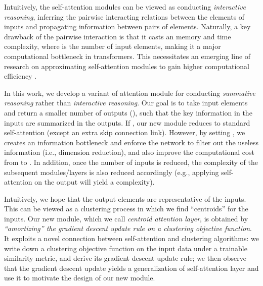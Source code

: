 \documentclass[english]{article}
\begin{document}
Intuitively, 
the self-attention modules 
can be viewed as conducting \emph{interactive reasoning}, 
inferring the pairwise interacting relations between the elements of inputs and 
propagating information between pairs of elements. 
Naturally, a key drawback of the pairwise interaction  is that it casts an  memory and time complexity, where  is the number of input elements, making it a major computational bottleneck in transformers. 
This necessitates an emerging line of research on approximating self-attention modules to gain higher computational efficiency 
\citep{kitaev2019reformer, katharopoulos2020transformers, wang2020linformer}. 





In this work, we develop a variant of attention module  for conducting \emph{summative reasoning} rather than \emph{interactive reasoning}. 
Our goal is to take  input elements and return a smaller number  of outputs (), such that the key information in the  inputs are summarized in the  outputs. 
If , our new module  reduces to standard self-attention  (except an extra skip connection link). 
However, by setting , 
we creates an information bottleneck and enforce the network to filter out the useless information (i.e., dimension reduction), and also 
improve the computational cost from  to .  
 In addition, once the number of inputs is reduced, the complexity of the subsequent 
 modules/layers is also reduced accordingly (e.g., applying self-attention on the output will yield a  complexity). 


Intuitively, we hope that the  output elements are representative of the  inputs. 
This can be viewed as a clustering process in which we
find  ``centroids'' for the inputs.
Our new module, which we call \emph{centroid attention layer}, 
is obtained by \emph{``amortizing'' the gradient descent update rule on a clustering objective function}.  
It exploits a novel connection between
self-attention and clustering algorithms: we 
write down a clustering objective function on the input data under a trainable similarity metric, and derive its gradient descent update rule; 
we then observe that the gradient descent update yields a generalization of self-attention layer and use it to motivate the design of our new module. 
\end{document}
